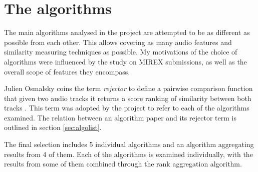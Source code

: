 
\chapter{The algorithms}
\label{chap:algorithms}
\ifpdf
    \graphicspath{{Algorithms/Figures/PNG/}{EvaluationTask/Figures/PDF/}{Algorithms/Figures/}}
\else
    \graphicspath{{Algorithms/Figures/EPS/}{EvaluationTask/Figures/}}
\fi


The main algorithms analysed in the project are attempted to be as different as
possible from each other. This allows covering as many audio features and
similarity measuring techniques as possible. My motivations of the choice of
algorithms were influenced by the study on MIREX submissions, as well as the
overall scope of features they encompass. 

Julien Osmalsky coins the term \textit{rejector} to define a pairwise comparison
function that given two audio tracks it returns a score ranking of similarity
between both tracks \cite{osmalsky2015combining}. This term was adopted by the
project to refer to each of the algorithms examined. The relation between an
algorithm paper and its rejector term is outlined in section \ref{sec:algolist}.

The final selection includes 5 individual algorithms and an algorithm
aggregating results from 4 of them. Each of the algorithms is examined
individually, with the results from some of them combined through the rank
aggregation algorithm.


